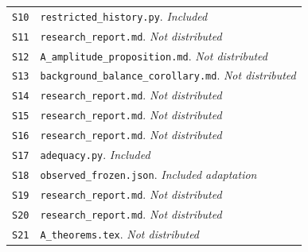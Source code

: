\begin{longtable}{@{}>{\raggedright\arraybackslash}p{}>{\raggedright\arraybackslash}p{}@{}}
\hypertarget{S10}{}\label{source:S10}\texttt{S10} & \nolinkurl{restricted_history.py}. \textit{Included} \\
\hypertarget{S11}{}\label{source:S11}\texttt{S11} & \nolinkurl{research_report.md}. \textit{Not distributed} \\
\hypertarget{S12}{}\label{source:S12}\texttt{S12} & \nolinkurl{A_amplitude_proposition.md}. \textit{Not distributed} \\
\hypertarget{S13}{}\label{source:S13}\texttt{S13} & \nolinkurl{background_balance_corollary.md}. \textit{Not distributed} \\
\hypertarget{S14}{}\label{source:S14}\texttt{S14} & \nolinkurl{research_report.md}. \textit{Not distributed} \\
\hypertarget{S15}{}\label{source:S15}\texttt{S15} & \nolinkurl{research_report.md}. \textit{Not distributed} \\
\hypertarget{S16}{}\label{source:S16}\texttt{S16} & \nolinkurl{research_report.md}. \textit{Not distributed} \\
\hypertarget{S17}{}\label{source:S17}\texttt{S17} & \nolinkurl{adequacy.py}. \textit{Included} \\
\hypertarget{S18}{}\label{source:S18}\texttt{S18} & \nolinkurl{observed_frozen.json}. \textit{Included adaptation} \\
\hypertarget{S19}{}\label{source:S19}\texttt{S19} & \nolinkurl{research_report.md}. \textit{Not distributed} \\
\hypertarget{S20}{}\label{source:S20}\texttt{S20} & \nolinkurl{research_report.md}. \textit{Not distributed} \\
\hypertarget{S21}{}\label{source:S21}\texttt{S21} & \nolinkurl{A_theorems.tex}. \textit{Not distributed} \\

\end{longtable}

